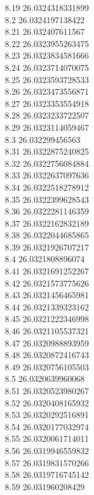 {8.19	26.0324318331899\\
8.2	26.0324197138422\\
8.21	26.032407611567\\
8.22	26.0323955263475\\
8.23	26.0323834581666\\
8.24	26.0323714070075\\
8.25	26.0323593728533\\
8.26	26.0323473556871\\
8.27	26.0323353554918\\
8.28	26.0323233722507\\
8.29	26.0323114059467\\
8.3	26.032299456563\\
8.31	26.0322875240825\\
8.32	26.0322756084884\\
8.33	26.0322637097636\\
8.34	26.0322518278912\\
8.35	26.0322399628543\\
8.36	26.0322281146359\\
8.37	26.0322162832189\\
8.38	26.0322044685865\\
8.39	26.0321926707217\\
8.4	26.0321808896074\\
8.41	26.0321691252267\\
8.42	26.0321573775626\\
8.43	26.0321456465981\\
8.44	26.0321339323162\\
8.45	26.0321222346998\\
8.46	26.0321105537321\\
8.47	26.0320988893959\\
8.48	26.0320872416743\\
8.49	26.0320756105503\\
8.5	26.0320639960068\\
8.51	26.0320523980267\\
8.52	26.0320408165932\\
8.53	26.0320292516891\\
8.54	26.0320177032974\\
8.55	26.0320061714011\\
8.56	26.0319946559832\\
8.57	26.0319831570266\\
8.58	26.0319716745142\\
8.59	26.031960208429\\
}
